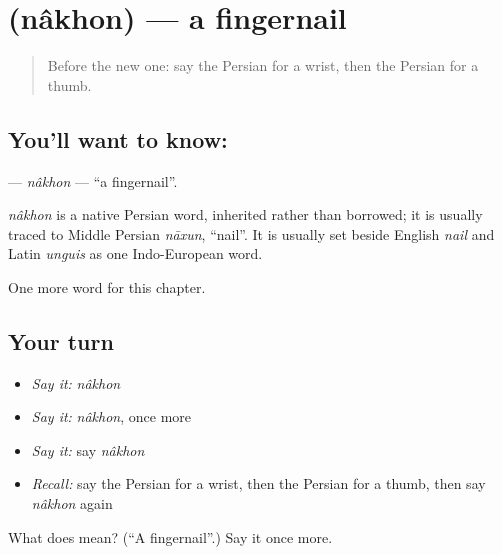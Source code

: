 \section[\texorpdfstring{\fa{ناخن} (nâkhon)}{ناخن (nâkhon)}]{ (nâkhon) — a fingernail}

\label{lesson:FA-C108-nakhon}



\begin{quote}
Before the new one: say the Persian for a wrist, then the Persian for a thumb.
\end{quote}

\subsection*{You'll want to know: }
\textbf{} — \emph{nâkhon} — \textquotedblleft{}a fingernail\textquotedblright{}.

\begin{cousinweb}
\emph{nâkhon} is a native Persian word, inherited rather than borrowed; it is usually traced to Middle Persian \emph{nāxun}, \textquotedblleft{}nail\textquotedblright{}. It is usually set beside English \emph{nail} and Latin \emph{unguis} as one Indo-European word.
\end{cousinweb}

\begin{grammarlens}[title={What you've built}]
One more word for this chapter.
\end{grammarlens}

\subsection*{Your turn}
\begin{itemize}
\raggedright
  \item \emph{Say it:} \emph{nâkhon}
  \item \emph{Say it:} \emph{nâkhon}, once more
  \item \emph{Say it:} say \emph{nâkhon}
  \item \emph{Recall:} say the Persian for a wrist, then the Persian for a thumb, then say \emph{nâkhon} again
\end{itemize}

\begin{tcolorbox}[breakable,colback=teal!4,colframe=teal!35!black,title={Before you move on}]
What does  mean? (\textquotedblleft{}A fingernail\textquotedblright{}.) Say it once more.
\end{tcolorbox}
